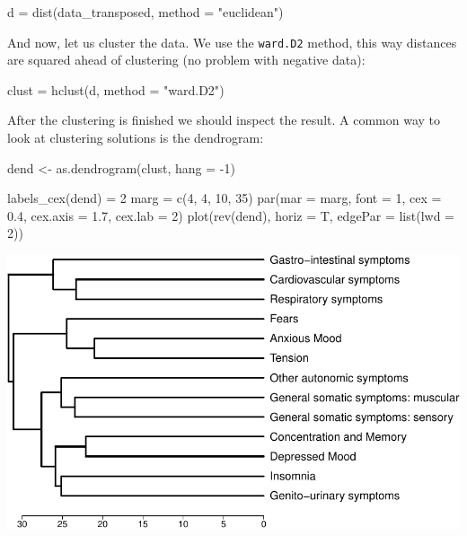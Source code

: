 \documentclass[
]{book}
\newenvironment{Shaded}{\begin{snugshade}}{\end{snugshade}}
\newcommand{\AttributeTok}[1]{\textcolor[rgb]{0.77,0.63,0.00}{#1}}
\newcommand{\DecValTok}[1]{\textcolor[rgb]{0.00,0.00,0.81}{#1}}
\newcommand{\FloatTok}[1]{\textcolor[rgb]{0.00,0.00,0.81}{#1}}
\newcommand{\FunctionTok}[1]{\textcolor[rgb]{0.00,0.00,0.00}{#1}}
\newcommand{\NormalTok}[1]{#1}
\newcommand{\OtherTok}[1]{\textcolor[rgb]{0.56,0.35,0.01}{#1}}
\newcommand{\SpecialCharTok}[1]{\textcolor[rgb]{0.00,0.00,0.00}{#1}}
\newcommand{\StringTok}[1]{\textcolor[rgb]{0.31,0.60,0.02}{#1}}
\begin{document}
\begin{Shaded}
\begin{Highlighting}[]
\NormalTok{d }\OtherTok{=} \FunctionTok{dist}\NormalTok{(data\_transposed, }\AttributeTok{method =} \StringTok{"euclidean"}\NormalTok{)}
\end{Highlighting}
\end{Shaded}

And now, let us cluster the data. We use the \texttt{ward.D2} method, this way distances are squared ahead of clustering (no problem with negative data):

\begin{Shaded}
\begin{Highlighting}[]
\NormalTok{clust }\OtherTok{=} \FunctionTok{hclust}\NormalTok{(d, }\AttributeTok{method =} \StringTok{"ward.D2"}\NormalTok{)}
\end{Highlighting}
\end{Shaded}

After the clustering is finished we should inspect the result. A common way to look at clustering solutions is the dendrogram:

\begin{Shaded}
\begin{Highlighting}[]
\NormalTok{dend }\OtherTok{\textless{}{-}} \FunctionTok{as.dendrogram}\NormalTok{(clust, }\AttributeTok{hang =} \SpecialCharTok{{-}}\DecValTok{1}\NormalTok{)}

\FunctionTok{labels\_cex}\NormalTok{(dend) }\OtherTok{=} \DecValTok{2}
\NormalTok{marg }\OtherTok{=} \FunctionTok{c}\NormalTok{(}\DecValTok{4}\NormalTok{, }\DecValTok{4}\NormalTok{, }\DecValTok{10}\NormalTok{, }\DecValTok{35}\NormalTok{)}
\FunctionTok{par}\NormalTok{(}\AttributeTok{mar =}\NormalTok{ marg, }\AttributeTok{font =} \DecValTok{1}\NormalTok{, }\AttributeTok{cex =} \FloatTok{0.4}\NormalTok{, }\AttributeTok{cex.axis =} \FloatTok{1.7}\NormalTok{, }\AttributeTok{cex.lab =} \DecValTok{2}\NormalTok{)}
\FunctionTok{plot}\NormalTok{(}\FunctionTok{rev}\NormalTok{(dend), }\AttributeTok{horiz =}\NormalTok{ T, }\AttributeTok{edgePar =} \FunctionTok{list}\NormalTok{(}\AttributeTok{lwd =} \DecValTok{2}\NormalTok{))}
\end{Highlighting}
\end{Shaded}

\includegraphics{DZP_R_bookdown_files/figure-latex/unnamed-chunk-17-1.pdf}
\end{document}

